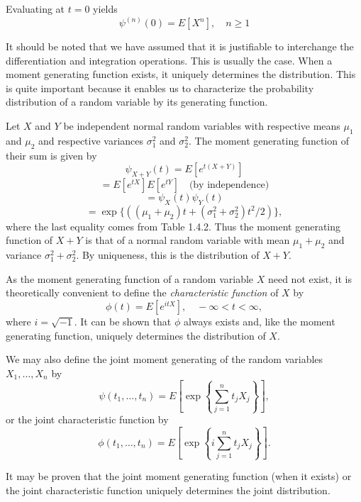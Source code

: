 \documentclass[lang=cn,10pt]{elegantbook}
\begin{document}
Evaluating at \(t = 0\) yields
\[
\psi^{(n)}(0) = E[X^n], \quad n \geq 1
\]

It should be noted that we have assumed that it is justifiable to interchange the differentiation and integration operations. This is usually the case. When a moment generating function exists, it uniquely determines the distribution. This is quite important because it enables us to characterize the probability distribution of a random variable by its generating function.

\begin{example}
	Let $X$ and $Y$ be independent normal random variables with respective means $\mu_1$ and $\mu_2$ and respective variances $\sigma_1^2$ and $\sigma_2^2$. The moment generating function of their sum is given by
\[
\psi_{X+Y}(t) = E[e^{t(X+Y)}]
\]
\[
= E[e^{tX}] E[e^{tY}] \quad \text{(by independence)}
\]
\[
= \psi_X(t) \psi_Y(t)
\]
\[
= \exp\{((\mu_1 + \mu_2)t + (\sigma_1^2 + \sigma_2^2)t^2/2)\},
\]
where the last equality comes from Table 1.4.2. Thus the moment generating function of $X + Y$ is that of a normal random variable with mean $\mu_1 + \mu_2$ and variance $\sigma_1^2 + \sigma_2^2$. By uniqueness, this is the distribution of $X + Y$.

As the moment generating function of a random variable $X$ need not exist, it is theoretically convenient to define the \textit{characteristic function} of $X$ by
\[
\phi(t) = E[e^{itX}], \quad -\infty < t < \infty,
\]
where $i = \sqrt{-1}$. It can be shown that $\phi$ always exists and, like the moment generating function, uniquely determines the distribution of $X$.

We may also define the joint moment generating of the random variables $X_1, \ldots, X_n$ by
\[
\psi(t_1, \ldots, t_n) = E\left[\exp\left\{\sum_{j=1}^{n} t_j X_j\right\}\right],
\]
or the joint characteristic function by
\[
\phi(t_1, \ldots, t_n) = E\left[\exp\left\{i \sum_{j=1}^{n} t_j X_j\right\}\right].
\]

It may be proven that the joint moment generating function (when it exists) or the joint characteristic function uniquely determines the joint distribution.
\end{example}
\end{document}
